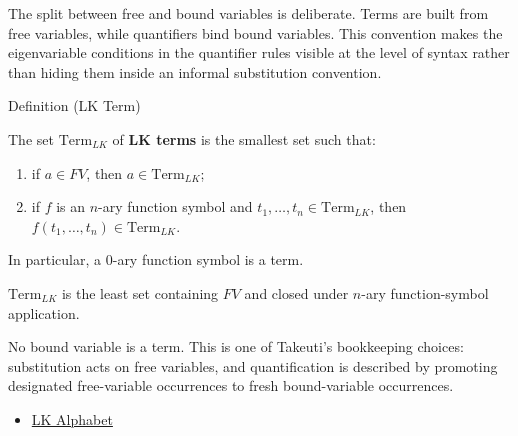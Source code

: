 \begin{remark*}[Interpretation]
The split between free and bound variables is deliberate. Terms are built from
free variables, while quantifiers bind bound variables. This convention makes
the eigenvariable conditions in the quantifier rules visible at the level of
syntax rather than hiding them inside an informal substitution convention.
\end{remark*}

\DefinitionalRoot

\begin{definitionbox}{Definition (LK Term)}
\begin{definition}[LK Term]\label{def:lk-term}
The set $\mathrm{Term}_{LK}$ of \textbf{LK terms} is the smallest set
such that:
\begin{enumerate}
  \item if $a \in FV$, then $a \in \mathrm{Term}_{LK}$;
  \item if $f$ is an $n$-ary function symbol and
        $t_1,\ldots,t_n \in \mathrm{Term}_{LK}$, then
        $f(t_1,\ldots,t_n) \in \mathrm{Term}_{LK}$.
\end{enumerate}
In particular, a $0$-ary function symbol is a term.
\end{definition}
\end{definitionbox}

\begin{remark*}
$\mathrm{Term}_{LK}$ is the least set containing $FV$ and closed under
$n$-ary function-symbol application.
\end{remark*}

\begin{remark*}[Interpretation]
No bound variable is a term. This is one of Takeuti's bookkeeping choices:
substitution acts on free variables, and quantification is described by
promoting designated free-variable occurrences to fresh bound-variable
occurrences.
\end{remark*}

\begin{dependencies}
\begin{itemize}
  \item \hyperref[def:lk-alphabet]{LK Alphabet}
\end{itemize}
\end{dependencies}

